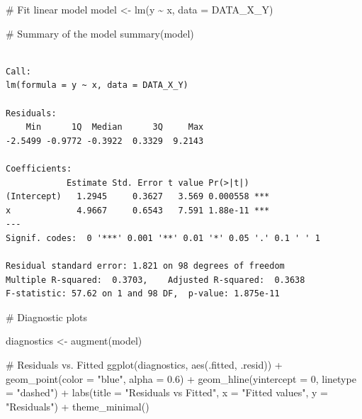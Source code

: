 \documentclass[
  11pt,
]{article}
\newenvironment{Shaded}{\begin{snugshade}}{\end{snugshade}}
\newcommand{\AttributeTok}[1]{\textcolor[rgb]{0.40,0.45,0.13}{#1}}
\newcommand{\CommentTok}[1]{\textcolor[rgb]{0.37,0.37,0.37}{#1}}
\newcommand{\DecValTok}[1]{\textcolor[rgb]{0.68,0.00,0.00}{#1}}
\newcommand{\FloatTok}[1]{\textcolor[rgb]{0.68,0.00,0.00}{#1}}
\newcommand{\FunctionTok}[1]{\textcolor[rgb]{0.28,0.35,0.67}{#1}}
\newcommand{\NormalTok}[1]{\textcolor[rgb]{0.00,0.23,0.31}{#1}}
\newcommand{\OtherTok}[1]{\textcolor[rgb]{0.00,0.23,0.31}{#1}}
\newcommand{\SpecialCharTok}[1]{\textcolor[rgb]{0.37,0.37,0.37}{#1}}
\newcommand{\StringTok}[1]{\textcolor[rgb]{0.13,0.47,0.30}{#1}}
\begin{document}
\begin{Shaded}
\begin{Highlighting}[]
\CommentTok{\# Fit linear model}
\NormalTok{model }\OtherTok{\textless{}{-}} \FunctionTok{lm}\NormalTok{(y }\SpecialCharTok{\textasciitilde{}}\NormalTok{ x, }\AttributeTok{data =}\NormalTok{ DATA\_X\_Y)}

\CommentTok{\# Summary of the model}
\FunctionTok{summary}\NormalTok{(model)}
\end{Highlighting}
\end{Shaded}

\begin{verbatim}

Call:
lm(formula = y ~ x, data = DATA_X_Y)

Residuals:
    Min      1Q  Median      3Q     Max 
-2.5499 -0.9772 -0.3922  0.3329  9.2143 

Coefficients:
            Estimate Std. Error t value Pr(>|t|)    
(Intercept)   1.2945     0.3627   3.569 0.000558 ***
x             4.9667     0.6543   7.591 1.88e-11 ***
---
Signif. codes:  0 '***' 0.001 '**' 0.01 '*' 0.05 '.' 0.1 ' ' 1

Residual standard error: 1.821 on 98 degrees of freedom
Multiple R-squared:  0.3703,    Adjusted R-squared:  0.3638 
F-statistic: 57.62 on 1 and 98 DF,  p-value: 1.875e-11
\end{verbatim}

\begin{Shaded}
\begin{Highlighting}[]
\CommentTok{\# Diagnostic plots}

\NormalTok{diagnostics }\OtherTok{\textless{}{-}} \FunctionTok{augment}\NormalTok{(model)}

\CommentTok{\# Residuals vs. Fitted}
\FunctionTok{ggplot}\NormalTok{(diagnostics, }\FunctionTok{aes}\NormalTok{(.fitted, .resid)) }\SpecialCharTok{+}
  \FunctionTok{geom\_point}\NormalTok{(}\AttributeTok{color =} \StringTok{"blue"}\NormalTok{, }\AttributeTok{alpha =} \FloatTok{0.6}\NormalTok{) }\SpecialCharTok{+}
  \FunctionTok{geom\_hline}\NormalTok{(}\AttributeTok{yintercept =} \DecValTok{0}\NormalTok{, }\AttributeTok{linetype =} \StringTok{"dashed"}\NormalTok{) }\SpecialCharTok{+}
  \FunctionTok{labs}\NormalTok{(}\AttributeTok{title =} \StringTok{"Residuals vs Fitted"}\NormalTok{, }\AttributeTok{x =} \StringTok{"Fitted values"}\NormalTok{, }
       \AttributeTok{y =} \StringTok{"Residuals"}\NormalTok{) }\SpecialCharTok{+}
  \FunctionTok{theme\_minimal}\NormalTok{()}
\end{Highlighting}
\end{Shaded}
\end{document}
